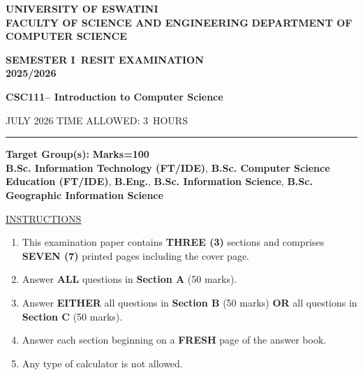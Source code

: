 \documentclass[12pt]{article}
\newcommand{\masunitnumber}{CSC111}
\newcommand{\examdate}{ JULY 2026}
\newcommand{\academicyear}{2025/2026}
\newcommand{\semester}{I}
\newcommand{\university}{UNIVERSITY OF ESWATINI}
\newcommand{\faculty}{FACULTY OF SCIENCE AND ENGINEERING}
\newcommand{\department}{DEPARTMENT OF COMPUTER SCIENCE}
\newcommand{\coursename}{Introduction to Computer Science}
\newcommand{\numberofhours}{3}
\begin{document}
\setlength{\headsep}{14truemm}
\setlength{\headheight}{14truemm}
\setlength{\voffset}{-0.4truein}
\renewcommand{\headrulewidth}{0.0pt}

 



\begin{center}
 
 \textbf{\large \university }  \\
  \textbf{\large \faculty } 
    \textbf{\large \department }  

\bf SEMESTER \semester\ RESIT EXAMINATION \\ \academicyear
\end{center}
\begin{center}
{\bf \masunitnumber -- \coursename}
\end{center}
\vspace{20truemm}

\noindent \examdate\hspace{55truemm} TIME ALLOWED: \numberofhours\ HOURS

\vspace{10truemm}
\hrule

\begin{minipage}{\textwidth}
\vspace{2} 
\small{\textbf{Target Group(s):}} \hfill   \textbf{Marks=100} \\
\textbf{B.Sc. Information Technology (FT/IDE)}, \textbf{B.Sc. Computer Science Education (FT/IDE)}, \textbf{B.Eng.}, \textbf{B.Sc. Information Science}, \textbf{B.Sc. Geographic Information Science}
\end{minipage}

\vspace{10truemm}
\noindent\underline{INSTRUCTIONS}
\vspace{5mm}

\begin{enumerate}
    \item This examination paper contains {\bf THREE (3)} sections and comprises {\bf SEVEN (7)} printed pages including the cover page.
    \item Answer \textbf{ALL} questions in \textbf{Section A} (50 marks).
    \item Answer \textbf{EITHER} all questions in \textbf{Section B} (50 marks) \textbf{OR} all questions in \textbf{Section C} (50 marks).
    \item Answer each section beginning on a {\bf FRESH} page of the answer book.
    \item Any type of calculator is not allowed.
\end{enumerate}
\end{document}
